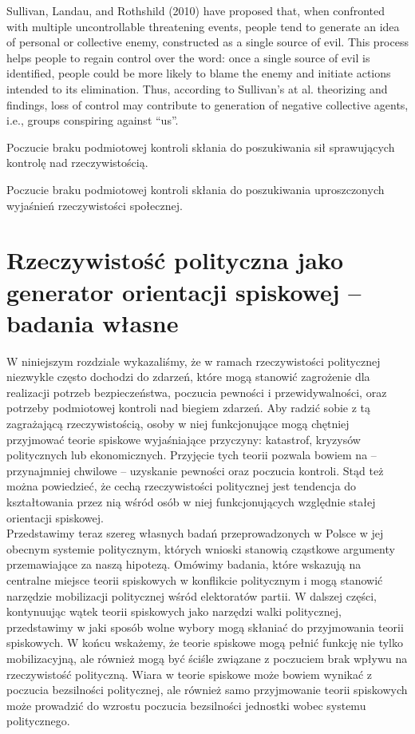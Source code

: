 \documentclass[man]{apa6}
\begin{document}
Sullivan, Landau, and Rothshild  (2010) have proposed that, when confronted with multiple uncontrollable threatening events, people tend to generate an idea of personal or collective enemy, constructed as a single source of evil. This process helps people to regain control over the word: once a single source of evil is identified, people could be more likely to blame the enemy and initiate actions intended to its elimination. Thus, according to Sullivan’s at al. theorizing and findings, loss of control may contribute to generation of negative collective agents, i.e., groups conspiring against ``us''.


    Poczucie braku podmiotowej kontroli skłania do poszukiwania sił sprawujących kontrolę nad rzeczywistością.

    Poczucie braku podmiotowej kontroli skłania do poszukiwania uproszczonych wyjaśnień rzeczywistości społecznej.

    \section{Rzeczywistość polityczna jako generator orientacji spiskowej -- badania własne}
    
    W niniejszym rozdziale wykazaliśmy, że w ramach rzeczywistości politycznej niezwykle często dochodzi do zdarzeń, które mogą stanowić zagrożenie dla realizacji potrzeb bezpieczeństwa, poczucia pewności i przewidywalności, oraz potrzeby podmiotowej kontroli nad biegiem zdarzeń. Aby radzić sobie z tą zagrażającą rzeczywistością, osoby w niej funkcjonujące mogą chętniej przyjmować teorie spiskowe wyjaśniające przyczyny: katastrof, kryzysów politycznych lub ekonomicznych. Przyjęcie tych teorii pozwala bowiem na -- przynajmniej chwilowe -- uzyskanie pewności oraz  poczucia kontroli. Stąd też można powiedzieć, że cechą rzeczywistości politycznej jest tendencja do kształtowania przez nią wśród osób w niej funkcjonujących względnie stałej orientacji spiskowej.\\
    Przedstawimy teraz szereg własnych badań przeprowadzonych w Polsce w jej obecnym systemie politycznym, których wnioski stanowią cząstkowe argumenty przemawiające za naszą hipotezą. Omówimy badania, które wskazują na centralne miejsce teorii spiskowych w konflikcie politycznym i mogą stanowić narzędzie mobilizacji politycznej wśród elektoratów partii. W dalszej części, kontynuując wątek teorii spiskowych jako narzędzi walki politycznej, przedstawimy w jaki sposób wolne wybory mogą skłaniać do przyjmowania teorii spiskowych. W końcu wskażemy, że teorie spiskowe mogą pełnić funkcję nie tylko mobilizacyjną, ale również mogą być ściśle związane z poczuciem brak wpływu na rzeczywistość polityczną. Wiara w teorie spiskowe może bowiem wynikać z poczucia bezsilności politycznej, ale również samo przyjmowanie teorii spiskowych może prowadzić do wzrostu poczucia bezsilności jednostki wobec systemu politycznego.
    
\end{document}
